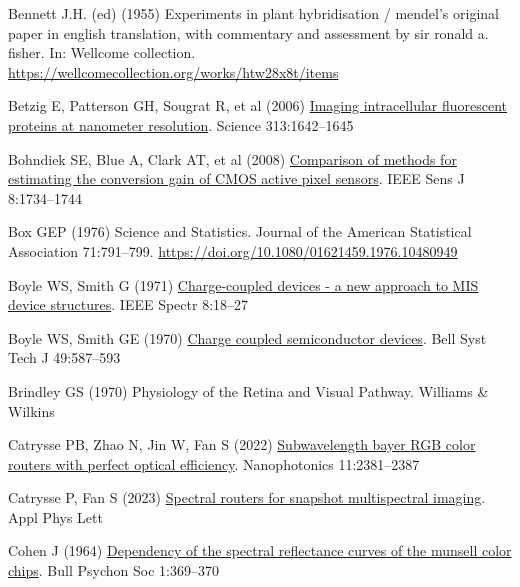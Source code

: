 \documentclass[
  letterpaper,
]{book}
\newlength{\cslhangindent}
\newenvironment{CSLReferences}[2] %
 {\begin{list}{}{%
  \setlength{\itemindent}{0pt}
  \setlength{\leftmargin}{0pt}
  \setlength{\parsep}{0pt}
  \ifodd #1
   \setlength{\leftmargin}{\cslhangindent}
   \setlength{\itemindent}{-1\cslhangindent}
  \fi
  \setlength{\itemsep}{#2\baselineskip}}}
 {\end{list}}
\begin{document}
\begin{CSLReferences}{1}{1}
Bennett J.H. (ed) (1955) Experiments in plant hybridisation / mendel's
original paper in english translation, with commentary and assessment by
sir ronald a. fisher. In: Wellcome collection.
\url{https://wellcomecollection.org/works/htw28x8t/items}

Betzig E, Patterson GH, Sougrat R, et al (2006)
\href{http://dx.doi.org/10.1126/science.1127344}{Imaging intracellular
fluorescent proteins at nanometer resolution}. Science 313:1642--1645

Bohndiek SE, Blue A, Clark AT, et al (2008)
\href{http://dx.doi.org/10.1109/jsen.2008.2004296}{Comparison of methods
for estimating the conversion gain of {CMOS} active pixel sensors}. IEEE
Sens J 8:1734--1744

Box GEP (1976) Science and {Statistics}. Journal of the American
Statistical Association 71:791--799.
\url{https://doi.org/10.1080/01621459.1976.10480949}

Boyle WS, Smith G (1971)
\href{https://ieeexplore.ieee.org/abstract/document/5218282/}{Charge-coupled
devices - a new approach to {MIS} device structures}. IEEE Spectr
8:18--27

Boyle WS, Smith GE (1970)
\href{https://onlinelibrary.wiley.com/doi/abs/10.1002/j.1538-7305.1970.tb01790.x}{Charge
coupled semiconductor devices}. Bell Syst Tech J 49:587--593

Brindley GS (1970) Physiology of the {Retina} and {Visual Pathway}.
Williams \& Wilkins

Catrysse PB, Zhao N, Jin W, Fan S (2022)
\href{http://dx.doi.org/10.1515/nanoph-2022-0069}{Subwavelength bayer
{RGB} color routers with perfect optical efficiency}. Nanophotonics
11:2381--2387

Catrysse P, Fan S (2023)
\href{http://dx.doi.org/10.1063/5.0176587}{Spectral routers for snapshot
multispectral imaging}. Appl Phys Lett

Cohen J (1964)
\href{https://link.springer.com/article/10.3758/BF03342963}{Dependency
of the spectral reflectance curves of the munsell color chips}. Bull
Psychon Soc 1:369--370


\end{CSLReferences}
\end{document}
